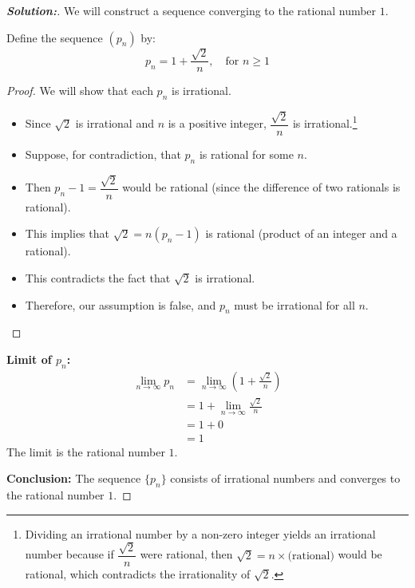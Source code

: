 \documentclass[12pt]{article}
\theoremstyle{definition}\newtheorem{problem}{Problem}
\newenvironment{solution}{\begin{proof}[\bfseries\textup{Solution:}]}{\end{proof}}
\begin{document}
\begin{solution}
We will construct a sequence converging to the rational number $1$.

 Define the sequence $(p_n)$ by:
    \begin{equation}\label{eq:p_n_definition}
    p_n = 1 + \frac{\sqrt{2}}{n}, \quad \text{for } n \geq 1
    \end{equation}

    \begin{proof}
    We will show that each $p_n$ is irrational.

    \begin{itemize}
        \item Since $\sqrt{2}$ is irrational and $n$ is a positive integer, $\dfrac{\sqrt{2}}{n}$ is irrational.\footnote{Dividing an irrational number by a non-zero integer yields an irrational number because if $\dfrac{\sqrt{2}}{n}$ were rational, then $\sqrt{2} = n \times \text{(rational)}$ would be rational, which contradicts the irrationality of $\sqrt{2}$.}

        \item Suppose, for contradiction, that $p_n$ is rational for some $n$.

        \item Then $p_n - 1 = \dfrac{\sqrt{2}}{n}$ would be rational (since the difference of two rationals is rational).

        \item This implies that $\sqrt{2} = n(p_n - 1)$ is rational (product of an integer and a rational).

        \item This contradicts the fact that $\sqrt{2}$ is irrational.

        \item Therefore, our assumption is false, and $p_n$ must be irrational for all $n$.
    \end{itemize}
    \end{proof}

    \item \textbf{Limit of $p_n$:}
    \begin{align*}
    \lim_{n \to \infty} p_n &= \lim_{n \to \infty} \left(1 + \frac{\sqrt{2}}{n}\right) \\
    &= 1 + \lim_{n \to \infty} \frac{\sqrt{2}}{n} \\
    &= 1 + 0 \\
    &= 1
    \end{align*}
    The limit is the rational number $1$.


\textbf{Conclusion: }
The sequence $\{p_n\}$ consists of irrational numbers and converges to the rational number $1$.


\end{solution}
\end{document}
